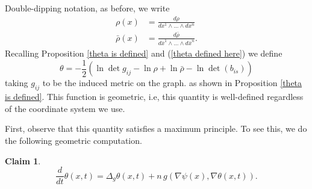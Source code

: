 \documentclass[12pt,letterpaper]{amsart}%
\newcounter{mycounter}
\numberwithin{mycounter}{section}
\theoremstyle{plain}
\newtheorem{claim}[mycounter]{Claim}
\numberwithin{equation}{section}
\theoremstyle{definition}
\begin{document}

Double-dipping notation, as before, we write
\begin{align*}
\rho(x)  &  =\frac{d\rho}{dx^{1}\wedge...\wedge dx^{n}}\\
\bar{\rho}(x)  &  =\frac{d\bar{\rho}}{d\bar{x}^{1}\wedge...\wedge d\bar{x}^{n}}.
\end{align*}
Recalling Proposition \ref{theta is defined}
and  (\ref{theta defined here})
we define
\begin{equation}
\theta =-\frac{1}{2} \left(\ln\det g_{ij} - \ln\rho + \ln\bar{\rho} - \ln\det\left( b_{is} \right) \right)
\label{def:theta}
\end{equation} taking $g_{ij}$ to be the induced metric on the graph. 
as shown in Proposition \ref{theta is defined}.
This function is geometric, i.e, this quantity is well-defined regardless of
the coordinate system we use.

First, observe that this quantity satisfies a maximum principle. To see this, we do the following geometric computation.
\begin{claim}
\label{thetalution}
\[
\frac{d}{dt}\theta(x,t) = \Delta_g \theta(x,t) 
   + n\, g(\nabla\psi(x),\nabla\theta(x,t)).
\]
\end{claim}
\end{document}
